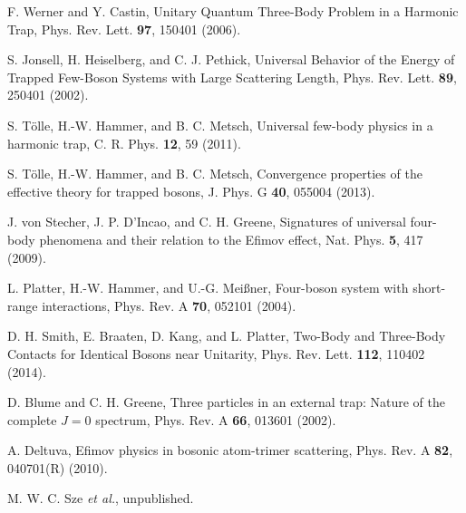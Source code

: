 \documentclass[aps,pra,twocolumn,showpacs,superscriptaddress]{revtex4}
\begin{document}
\begin{thebibliography}{100}
F. Werner and Y. Castin,
Unitary Quantum Three-Body Problem in a Harmonic Trap,
Phys. Rev. Lett. {\bf{97}}, 150401 (2006). 

S. Jonsell, H. Heiselberg, and C. J. Pethick,
Universal Behavior of the Energy of Trapped 
Few-Boson Systems with Large Scattering Length,
Phys. Rev. Lett. {\bf{89}}, 250401 (2002).

S. T\"olle, H.-W. Hammer, and B. C. Metsch,
Universal few-body physics in a harmonic trap,
C. R. Phys. {\bf{12}}, 59 (2011).

S. T\"olle, H.-W. Hammer, and B. C. Metsch,
Convergence properties of the effective theory for trapped bosons,
J. Phys. G {\bf{40}}, 055004 (2013). 

J. von Stecher, J. P. D'Incao, and C. H. Greene,
Signatures of universal four-body phenomena 
and their relation to the Efimov effect,
Nat. Phys. {\bf{5}}, 417 (2009).

L. Platter, H.-W. Hammer, and U.-G. Mei{\ss}ner,
Four-boson system with short-range interactions,
Phys. Rev. A {\bf{70}}, 052101 (2004).

D. H. Smith, E. Braaten, D. Kang, and L. Platter,
Two-Body and Three-Body Contacts for Identical Bosons near Unitarity,
Phys. Rev. Lett. {\bf{112}}, 110402 (2014).

D. Blume and C. H. Greene,
Three particles in an external trap: Nature of the complete 
$J=0$ spectrum,
Phys. Rev. A {\bf{66}}, 013601 (2002).

A. Deltuva,
Efimov physics in bosonic atom-trimer scattering,
Phys. Rev. A {\bf{82}}, 040701(R) (2010). 

  M. W. C. Sze {\em{et al.}},
  unpublished.

\end{thebibliography}
\end{document}
